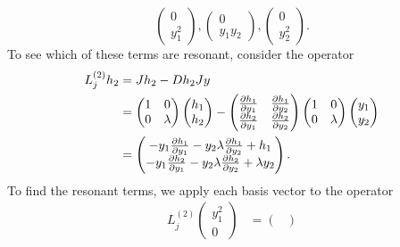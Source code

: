 \documentclass[12pt]{report}
\begin{document}
\begin{solution}
\[        \begin{pmatrix}
            0 \\ y_1^2
        \end{pmatrix},
        \begin{pmatrix}
            0 \\ y_1y_2
        \end{pmatrix},
        \begin{pmatrix}
            0 \\ y_2^2
        \end{pmatrix}.
    \]
    To see which of these terms are resonant, consider the operator
    \begin{align*}
        L_j^{(2)}h_2 &= Jh_2 - Dh_2 Jy\\
        &= \begin{pmatrix}
            1  & 0\\ 0 & \lambda
        \end{pmatrix}\begin{pmatrix}
            h_1 \\ h_2
        \end{pmatrix} - \begin{pmatrix}
            \frac{\partial h_1}{\partial y_1} &  \frac{\partial h_1}{\partial y_2}\\
            \frac{\partial h_2}{\partial y_1} &  \frac{\partial h_2}{\partial y_2}\\
        \end{pmatrix}
        \begin{pmatrix}
            1  & 0\\ 0 & \lambda
        \end{pmatrix}
        \begin{pmatrix}
            y_1\\y_2
        \end{pmatrix}\\
        &= \begin{pmatrix}
            -y_1 \frac{\partial h_1}{\partial y_1} - y_2 \lambda \frac{\partial h_1}{\partial y_2} + h_1\\
            -y_1 \frac{\partial h_2}{\partial y_1} - y_2\lambda \frac{\partial h_2}{\partial y_2} + \lambda y_2
        \end{pmatrix}.
    \end{align*}
    To find the resonant terms, we apply each basis vector to the operator
    \begin{align*}
        L_j^{(2)} \begin{pmatrix}
            y_1^2 \\ 0
        \end{pmatrix} &= \begin{pmatrix}

\end{pmatrix}
\end{align*}
\end{solution}
\end{document}
